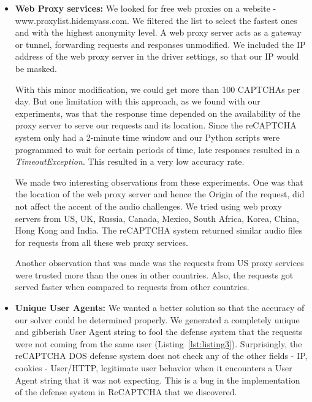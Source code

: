 \begin{itemize}
	\item \textbf{Web Proxy services:} We looked for free web proxies on a website - www.proxylist.hidemyass.com. We filtered the list to select the fastest ones and with the highest anonymity level. A web proxy server acts as a gateway or tunnel, forwarding requests and responses unmodified. We included the IP address of the web proxy server in the driver settings, so that our IP would be masked.\newline  
    
With this minor modification, we could get more than 100 CAPTCHAs per day. But one limitation with this approach, as we found with our experiments, was that the response time depended on the availability of the proxy server to serve our requests and its location. Since the reCAPTCHA system only had a 2-minute time window and our Python scripts were programmed to wait for certain periods of time, late responses resulted in a \textit{TimeoutException}. This resulted in a very low accuracy rate.\newline

We made two interesting observations from these experiments. One was that the location of the web proxy server and hence the Origin of the request, did not affect the accent of the audio challenges. We tried using web proxy servers from US, UK, Russia, Canada, Mexico, South Africa, Korea, China, Hong Kong and India. The reCAPTCHA system returned similar audio files for requests from all these web proxy services.\newline

Another observation that was made was the requests from US proxy services were trusted more than the ones in other countries. Also, the requests got served faster when compared to requests from other countries.\newline

	\item \textbf{Unique User Agents:} We wanted a better solution so that the accuracy of our solver could be determined properly. We generated a completely unique and gibberish User Agent string to fool the defense system that the requests were not coming from the same user (Listing~\ref{lst:listing3}). Surprisingly, the reCAPTCHA DOS defense system does not check any of the other fields - IP, cookies - User/HTTP, legitimate user behavior when it encounters a User Agent string that it was not expecting. This is a bug in the implementation of the defense system in ReCAPTCHA that we discovered. \newline
    

\end{itemize}
